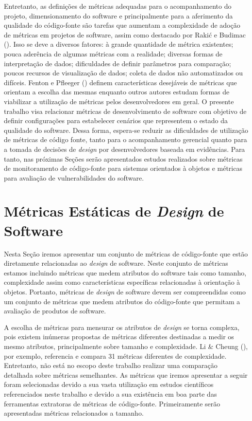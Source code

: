 Entretanto, as definições de métricas adequadas para o acompanhamento do projeto, dimensionamento do software e principalmente para a aferimento da qualidade do código-fonte são tarefas que aumentam a complexidade de adoção de métricas em projetos de software, assim como destacado por Rakić e Budimac (\citeyear{rakic2011budimac}).
%
Isso se deve a diversos fatores: à grande quantidade de métrica existentes; pouca aderência de algumas métricas com a realidade; diversas formas de interpretação de dados; dificuldades de definir parâmetros para comparação; poucos recursos de visualização de dados; coleta de dados não automatizados ou difíceis.
%
Fenton e Pfleeger (\citeyear{fenton1998}) definem características desejáveis de métricas que orientam a escolha das mesmas enquanto outros autores estudam formas de viabilizar a utilização de métricas pelos desenvolvedores em geral\cite{meirelles2013metrics,almeida2010}.
%
O presente trabalho visa relacionar métricas de desenvolvimento de software com objetivo de definir configurações para estabelecer cenários que representem o estado da qualidade do software. Dessa forma, espera-se reduzir as dificuldades de utilização de métricas de código fonte, tanto para o acompanhamento gerencial quanto para a tomada de decisões de \emph{design} por desenvolvedores baseada em evidências. Para tanto, nas próximas Seções serão apresentados estudos realizados sobre métricas de monitoramento de código-fonte para sistemas orientados à objetos e métricas para avaliação de vulnerabilidades do software.

%

\section{Métricas Estáticas de \emph{Design} de Software}

Nesta Seção iremos apresentar um conjunto de métricas de código-fonte que estão diretamente relacionadas ao \emph{design} de software. Neste conjunto de métricas estamos incluindo métricas que medem atributos do software tais como tamanho, complexidade assim como características específicas relacionadas à orientação à objetos. Portanto, métricas de \emph{design} de software devem ser compreendidas como um conjunto de métricas que medem atributos do código-fonte que permitam a avaliação de produtos de software.

%

A escolha de métricas para mensurar os atributos de \emph{design} se torna complexa, pois existem inúmeras propostas de métricas diferentes destinadas a medir os mesmo atributos, principalmente sobre tamanho e complexidade. Li \& Cheung (\citeyear{li1987}), por exemplo, referencia e compara 31 métricas diferentes de complexidade. Entretanto, não está no escopo deste trabalho realizar uma comparação detalhada sobre métricas semelhantes. As métricas que iremos apresentar a seguir foram selecionadas devido a sua vasta utilização em estudos científicos referenciados neste trabalho e devido a sua existência em boa parte das ferramentas extratoras de métricas de código-fonte. Primeiramente serão apresentadas métricas relacionados a tamanho.

